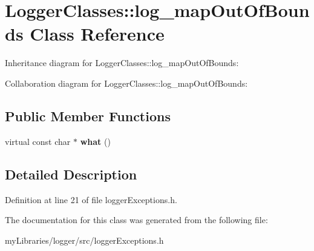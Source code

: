 \hypertarget{classLoggerClasses_1_1log__mapOutOfBounds}{}\section{Logger\+Classes\+::log\+\_\+map\+Out\+Of\+Bounds Class Reference}
\label{classLoggerClasses_1_1log__mapOutOfBounds}


Inheritance diagram for Logger\+Classes\+::log\+\_\+map\+Out\+Of\+Bounds\+:


Collaboration diagram for Logger\+Classes\+::log\+\_\+map\+Out\+Of\+Bounds\+:
\subsection*{Public Member Functions}
\begin{DoxyCompactItemize}
\item 
\mbox{\label{classLoggerClasses_1_1log__mapOutOfBounds_acbba12d8ef6f1716e2c97778ebe83a65}} 
virtual const char $\ast$ {\bfseries what} ()
\end{DoxyCompactItemize}


\subsection{Detailed Description}


Definition at line 21 of file logger\+Exceptions.\+h.



The documentation for this class was generated from the following file\+:\begin{DoxyCompactItemize}
\item 
my\+Libraries/logger/src/logger\+Exceptions.\+h\end{DoxyCompactItemize}
